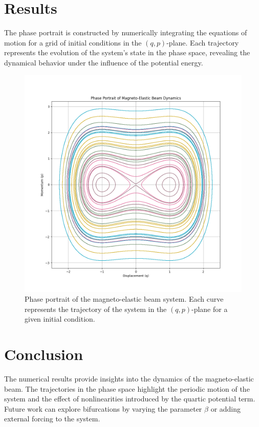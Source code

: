 \documentclass[11pt]{article}
\begin{document}
\section*{Results}
The phase portrait is constructed by numerically integrating the equations of motion for a grid of initial conditions in the \( (q, p) \)-plane. Each trajectory represents the evolution of the system's state in the phase space, revealing the dynamical behavior under the influence of the potential energy.

\begin{figure}[h!]
    \centering
    \includegraphics[width=\textwidth]{magneto-elastic_Beam_phase_Portrait.png}
    \caption{Phase portrait of the magneto-elastic beam system. Each curve represents the trajectory of the system in the \( (q, p) \)-plane for a given initial condition.}
    \label{fig:phase_portrait}
\end{figure}

\section*{Conclusion}
The numerical results provide insights into the dynamics of the magneto-elastic beam. The trajectories in the phase space highlight the periodic motion of the system and the effect of nonlinearities introduced by the quartic potential term. Future work can explore bifurcations by varying the parameter \( \beta \) or adding external forcing to the system.
\end{document}
